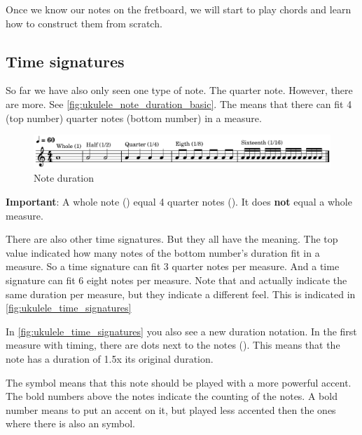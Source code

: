 Once we know our notes on the fretboard, we will start to play chords and learn how to construct them from scratch.

\newpage

\subsection{Time signatures}

So far we have also only seen one type of note. The quarter note. However, there are more. See \autoref{fig:ukulele_note_duration_basic}. The  means that there can fit 4 (top number) quarter notes (bottom number) in a measure. 

\begin{figure}[h]
	\centering
	\includegraphics[width=\textwidth]{../../MuseScore/Ukulele/MusicNotation/NoteDurations_Basic.png}
	\caption{Note duration}
	\label{fig:ukulele_note_duration_basic}
\end{figure}

\textbf{Important}: A whole note (\wholeNote) equal 4 quarter notes (\quarterNote). It does \textbf{not} equal a whole measure. \newline

There are also other time signatures. But they all have the meaning. The top value indicated how many notes of the bottom number's duration fit in a measure. So a  time signature can fit 3 quarter notes per measure. And a  time signature can fit 6 eight notes per measure. Note that  and  actually indicate the same duration per measure, but they indicate a different feel. This is indicated in \autoref{fig:ukulele_time_signatures}

In \autoref{fig:ukulele_time_signatures} you also see a new duration notation. In the first measure with  timing, there are dots next to the notes (\quarterNoteDottedDown). This means that the note has a duration of 1.5x its original duration.

The \lilyAccent symbol means that this note should be played with a more powerful accent. The bold numbers above the notes indicate the counting of the notes. A bold number means to put an accent on it, but played less accented then the ones where there is also an \lilyAccent symbol.

